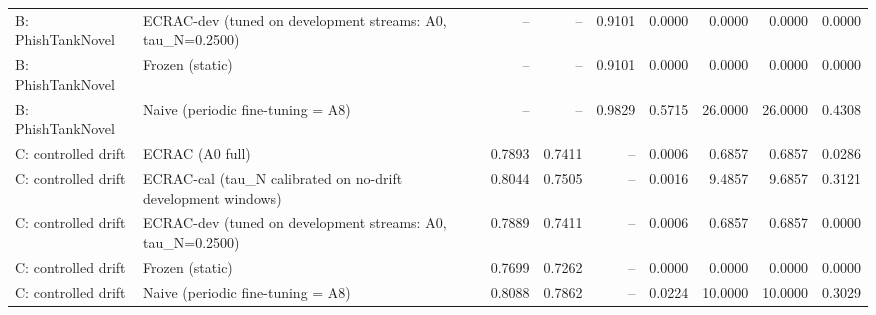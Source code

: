 \begin{table}[t]
\begin{tabular}{llrrrrrrr}
B: PhishTankNovel & ECRAC-dev (tuned on development streams: A0, tau\_N=0.2500) & -- & -- & 0.9101 & 0.0000 & 0.0000 & 0.0000 & 0.0000 \\
B: PhishTankNovel & Frozen (static) & -- & -- & 0.9101 & 0.0000 & 0.0000 & 0.0000 & 0.0000 \\
B: PhishTankNovel & Naive (periodic fine-tuning = A8) & -- & -- & 0.9829 & 0.5715 & 26.0000 & 26.0000 & 0.4308 \\
C: controlled drift & ECRAC (A0 full) & 0.7893 & 0.7411 & -- & 0.0006 & 0.6857 & 0.6857 & 0.0286 \\
C: controlled drift & ECRAC-cal (tau\_N calibrated on no-drift development windows) & 0.8044 & 0.7505 & -- & 0.0016 & 9.4857 & 9.6857 & 0.3121 \\
C: controlled drift & ECRAC-dev (tuned on development streams: A0, tau\_N=0.2500) & 0.7889 & 0.7411 & -- & 0.0006 & 0.6857 & 0.6857 & 0.0000 \\
C: controlled drift & Frozen (static) & 0.7699 & 0.7262 & -- & 0.0000 & 0.0000 & 0.0000 & 0.0000 \\
C: controlled drift & Naive (periodic fine-tuning = A8) & 0.8088 & 0.7862 & -- & 0.0224 & 10.0000 & 10.0000 & 0.3029 \\
\bottomrule
\end{tabular}
\end{table}